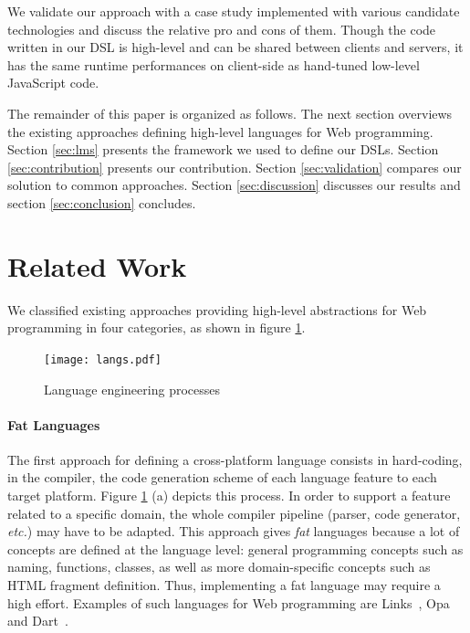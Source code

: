 \documentclass[preprint]{sigplanconf}
\newcommand{\etc}{\emph{etc.}}
\begin{document}
We validate our approach with a case study implemented with various candidate technologies and
discuss the relative pro and cons of them. Though the code written in our DSL is high-level and can
be shared between clients and servers, it has the same runtime performances on client-side as
hand-tuned low-level JavaScript code.

The remainder of this paper is organized as follows. The next section overviews the
existing approaches defining high-level languages for Web programming. Section \ref{sec:lms}
presents the framework we used to define our DSLs. Section \ref{sec:contribution} presents our
contribution. Section \ref{sec:validation} compares our solution to common approaches. Section
\ref{sec:discussion} discusses our results and section \ref{sec:conclusion} concludes.

\section{Related Work}
\label{sec:related-work}



We classified existing approaches providing high-level abstractions for Web programming in four
categories, as shown in figure \ref{fig:langs}.

\begin{figure}[htb]
\begin{center}
\texttt{[image: langs.pdf]}
\end{center}
\caption{Language engineering processes}
\vspace{-0.5cm}
\label{fig:langs}
\end{figure}

\paragraph{Fat Languages}

\enlargethispage{0.3cm}

The first approach for defining a cross-platform language consists in hard-coding, in the compiler,
the code generation scheme of each language feature to each target platform. Figure \ref{fig:langs}
(a) depicts this process. In order to support a feature related to a specific domain, the whole
compiler pipeline (parser, code generator, \etc) may have to be adapted. This approach gives
\emph{fat} languages because a lot of concepts are defined at the language level: general
programming concepts such as naming, functions, classes, as well as more domain-specific concepts
such as HTML fragment definition. Thus, implementing a fat language may require a high effort.
Examples of such languages for Web programming are Links~\cite{Cooper07_Links}, Opa and
Dart~\cite{Griffith11_Dart}.
\end{document}
